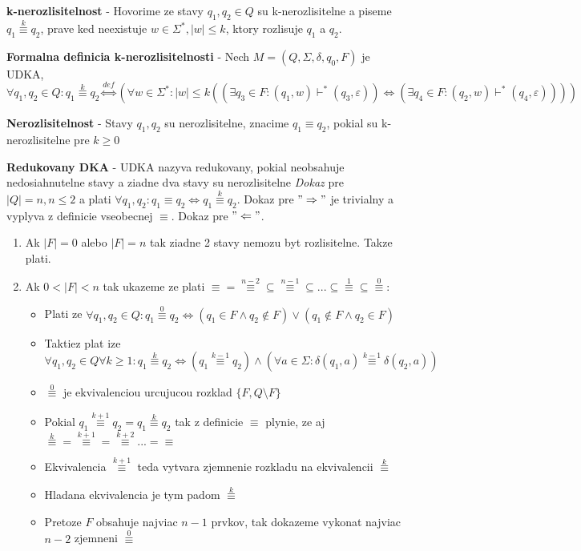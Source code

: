 \documentclass[12pt]{article}
\begin{document}
\textbf{k-nerozlisitelnost} - Hovorime ze stavy $q_{1}, q_{2} \in Q$ su k-nerozlisitelne a piseme
$q_{1} \overset{k}{\equiv} q_{2}$, prave ked neexistuje $w \in \Sigma^{*}, |w| \le k$, ktory rozlisuje $q_{1}$ a $q_{2}$.

\textbf{Formalna definicia k-nerozlisitelnosti} - Nech $M = (Q, \Sigma, \delta, q_{0}, F)$ je UDKA,
$\forall q_{1},q_{2} \in Q: q_{1} \overset{k}{\equiv} q_{2} \overset{def}{\Leftrightarrow}
(\forall w \in \Sigma^{*}: |w| \le k ((\exists q_{3}\in F: (q_{1},w) \vdash^{*} (q_{3}, \varepsilon)) \Leftrightarrow
(\exists q_{4} \in F: (q_{2},w) \vdash^{*} (q_{4}, \varepsilon))))$

\textbf{Nerozlisitelnost} - Stavy $q_{1}, q_{2}$ su nerozlisitelne, znacime $q_{1} \equiv q_{2}$, pokial su
k-nerozlisitelne pre $k \ge 0$

\textbf{Redukovany DKA} - UDKA nazyva redukovany, pokial neobsahuje nedosiahnutelne stavy a ziadne
dva stavy su nerozlisitelne
\emph{Dokaz} pre $|Q| = n, n \le 2$ a plati $\forall q_{1},q_{2}: q_{1} \equiv q_{2} \Leftrightarrow q_{1} \overset{k}{\equiv} q_{2}$.
Dokaz pre $"\Rightarrow"$ je trivialny a vyplyva z definicie vseobecnej $\equiv$. Dokaz pre $"\Leftarrow"$.
\begin{enumerate}
	\item Ak $|F| = 0$ alebo $|F| = n$ tak ziadne 2 stavy nemozu byt rozlisitelne. Takze plati.
	\item Ak $0 < |F| < n$ tak ukazeme ze plati $\equiv = \overset{n-2}{\equiv} \subseteq \overset{n-1}{\equiv}
		\subseteq ... \subseteq \overset{1}{\equiv} \subseteq \overset{0}{\equiv}$:
		\begin{itemize}
			\item Plati ze $\forall q_{1}, q_{2} \in Q: q_{1} \overset{0}{\equiv} q_{2} \Leftrightarrow
				(q_{1} \in F \land q_{2} \not\in F) \lor (q_{1} \not\in F \land q_{2} \in F)$
			\item Taktiez plat ize $\forall q_{1}, q_{2} \in Q \forall k \ge 1: q_{1} \overset{k}{\equiv} q_{2} \Leftrightarrow
				(q_{1} \overset{k-1}{\equiv} q_{2}) \land (\forall a \in \Sigma: \delta(q_{1}, a) \overset{k-1}{\equiv} \delta(q_{2}, a))$
			\item $\overset{0}{\equiv}$ je ekvivalenciou urcujucou rozklad $\{F, Q\setminus F\}$
			\item Pokial $q_{1} \overset{k+1}{\equiv} q_{2} = q_{1} \overset{k}{\equiv} q_{2}$ tak z definicie $\equiv$ plynie, ze
				aj $\overset{k}{\equiv} = \overset{k+1}{\equiv} = \overset{k+2}{\equiv} ... = \equiv$
			\item Ekvivalencia $\overset{k+1}{\equiv}$ teda vytvara zjemnenie rozkladu na ekvivalencii $\overset{k}{\equiv}$
			\item Hladana ekvivalencia je tym padom $\overset{k}{\equiv}$
			\item Pretoze $F$ obsahuje najviac $n - 1$ prvkov, tak dokazeme vykonat najviac $n - 2$ zjemneni $\overset{0}{\equiv}$
		\end{itemize}
\end{enumerate}
\end{document}
